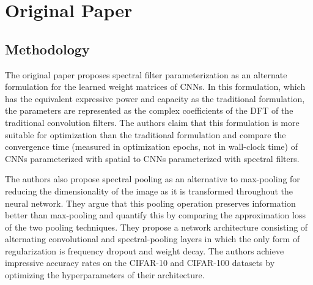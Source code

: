 \documentclass[10pt,journal,compsoc]{IEEEtran}
\begin{document}

\section{Original Paper}

\subsection{Methodology}
The original paper \cite{refpaper} proposes spectral filter parameterization as an alternate formulation for the learned weight matrices of CNNs. In this formulation, which has the equivalent expressive power and capacity as the traditional formulation, the parameters are represented as the complex coefficients of the DFT of the traditional convolution filters. The authors claim that this formulation is more suitable for optimization than the traditional formulation and compare the convergence time (measured in optimization epochs, not in wall-clock time) of CNNs parameterized with spatial to CNNs parameterized with spectral filters.

The authors also propose spectral pooling as an alternative to max-pooling for reducing the dimensionality of the image as it is transformed throughout the neural network. They argue that this pooling operation preserves information better than max-pooling and quantify this by comparing the approximation loss of the two pooling techniques. They propose a network architecture consisting of alternating convolutional and spectral-pooling layers in which the only form of regularization is frequency dropout and weight decay. The authors achieve impressive accuracy rates on the CIFAR-10 and CIFAR-100 datasets by optimizing the hyperparameters of their architecture.
\end{document}
